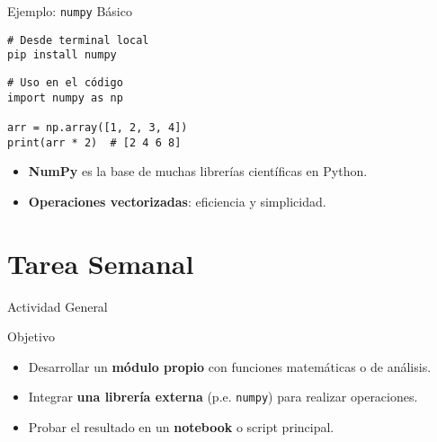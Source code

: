 \documentclass[10pt]{beamer}
\begin{document}
\begin{frame}[fragile]{Ejemplo: \texttt{numpy} Básico}
\begin{verbatim}
# Desde terminal local
pip install numpy
\end{verbatim}
\begin{verbatim}
# Uso en el código
import numpy as np

arr = np.array([1, 2, 3, 4])
print(arr * 2)  # [2 4 6 8]
\end{verbatim}
\begin{itemize}
  \item \textbf{NumPy} es la base de muchas librerías científicas en Python.
  \item \textbf{Operaciones vectorizadas}: eficiencia y simplicidad.
\end{itemize}
\end{frame}

\section{Tarea Semanal}

\begin{frame}{Actividad General}
  \begin{block}{Objetivo}
    \begin{itemize}
      \item Desarrollar un \textbf{módulo propio} con funciones matemáticas o de análisis.
      \item Integrar \textbf{una librería externa} (p.e. \texttt{numpy}) para realizar operaciones.
      \item Probar el resultado en un \textbf{notebook} o script principal.
    \end{itemize}
  \end{block}
\end{frame}
\end{document}
